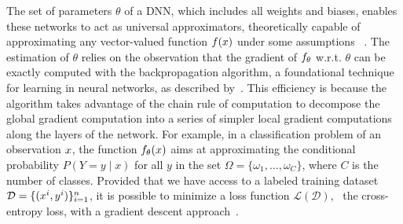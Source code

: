 The set of parameters $\theta$ of a DNN,
which includes all weights and biases, enables these networks to act as
universal approximators, theoretically capable of approximating 
any vector-valued function $f(x)$ under some assumptions
~\citep{cybenko1989approximation,hornik1991approximation,
pinkus1999approximation,lu2017expressive, liang2016deep}.
The estimation of $\theta$ relies on the observation that the gradient of $f_{\theta}$
w.r.t. $\theta$ can be exactly computed with the backpropagation algorithm,
a foundational technique for learning in neural networks, as described
by~\cite{rumelhart1985learning,hecht1992theory}.
This efficiency is because the algorithm takes advantage of the chain rule of
computation to decompose the global gradient computation into a series of
simpler local gradient computations along the layers of the network. 
For example, in  a classification problem of an observation $x$, 
the function  $f_{\theta}(x)$ 
aims at approximating the conditional probability \( P(Y = y \mid x) \) for all
\( y \) in  the 
set $\Omega = \{\omega_1, \ldots, \omega_{C}\}$, 
where $C$ is the number of classes.
Provided that we have access to a labeled training dataset
$\mathcal{D} = \{(x^i, y^i)\}_{i=1}^n$, it is possible to
minimize a loss function $\mathcal{L}(\mathcal{D})$, \eg~the cross-entropy loss,
 with a gradient descent approach~\citep{ruder2016overview}. 



